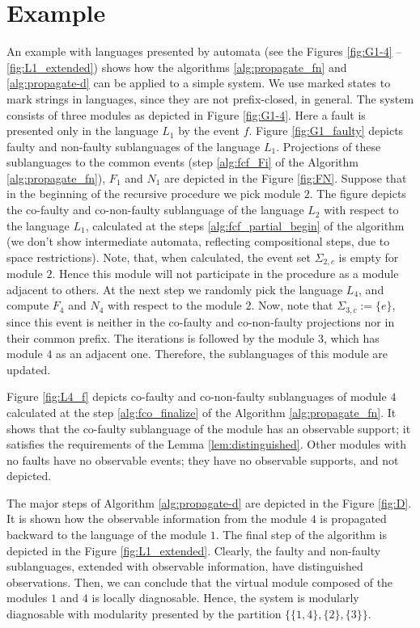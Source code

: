 \section{Example}
\label{sec:Example}
An example with languages presented by automata (see the Figures \ref{fig:G1-4}
-- \ref{fig:L1_extended}) shows how the algorithms \ref{alg:propagate_fn} and
\ref{alg:propagate-d} can be applied to a simple system. We use marked states to
mark strings in languages, since they are not prefix-closed, in general. The
system consists of three modules as depicted in Figure \ref{fig:G1-4}. Here a
fault is presented only in the language $L_1$ by the event $f$.
Figure \ref{fig:G1_faulty} depicts faulty and non-faulty sublanguages of the
language $L_1$. Projections of these sublanguages to the common events (step
\ref{alg:fcf_Fi} of the Algorithm \ref{alg:propagate_fn}), $F_1$ and $N_1$ are
depicted in the Figure \ref{fig:FN}. Suppose that in the beginning of the
recursive procedure we pick module $2$. The figure depicts the co-faulty
and co-non-faulty sublanguage of the language $L_2$ with respect to the language
$L_1$, calculated at the steps \ref{alg:fcf_partial_begin} of the algorithm (we
don't show intermediate automata, reflecting compositional steps, due to space
restrictions). Note, that, when calculated, the event set $\Sigma_{2,c}$ is
empty for module $2$. Hence this module will not participate in the procedure
as a module adjacent to others. At the next step we randomly pick the language
$L_4$, and compute $F_4$ and $N_4$ with respect to the module $2$. Now, note
that $\Sigma_{3,c}:= \{e\}$, since this event is neither in the co-faulty and
co-non-faulty projections nor in their common prefix. The iterations is followed
by the module $3$, which has module $4$ as an adjacent one. Therefore, the
sublanguages of this module are updated.

Figure \ref{fig:L4_f} depicts co-faulty and co-non-faulty sublanguages of module
$4$ calculated at the step \ref{alg:fco_finalize} of the Algorithm
\ref{alg:propagate_fn}. It shows that the co-faulty sublanguage of the module
has an observable support; it satisfies the requirements of the Lemma
\ref{lem:distinguished}. Other modules with no faults have no observable
events; they have no observable supports, and not depicted.

The major steps of Algorithm \ref{alg:propagate-d} are depicted in the Figure
\ref{fig:D}. It is shown how the observable information from the module $4$ is
propagated backward to the language of the module $1$. The final step of the
algorithm is depicted in the Figure \ref{fig:L1_extended}. Clearly, the faulty
and non-faulty sublanguages, extended with observable information, have
distinguished observations. Then, we can conclude that the virtual module
composed of the modules $1$ and $4$ is locally diagnosable. Hence, the system is
modularly diagnosable with modularity presented by the partition 
$\{\{1,4\}, \{2\}, \{3\}\}$.



